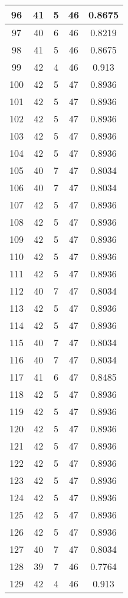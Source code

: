 \documentclass[letterpaper, 12pt]{article}
\begin{document}
\begin{longtable}{|c|c|c|c|c|}
\hline
96 & 41 & 5 & 46 & 0.8675 \\
\hline
97 & 40 & 6 & 46 & 0.8219 \\
\hline
98 & 41 & 5 & 46 & 0.8675 \\
\hline
99 & 42 & 4 & 46 & 0.913 \\
\hline
100 & 42 & 5 & 47 & 0.8936 \\
\hline
101 & 42 & 5 & 47 & 0.8936 \\
\hline
102 & 42 & 5 & 47 & 0.8936 \\
\hline
103 & 42 & 5 & 47 & 0.8936 \\
\hline
104 & 42 & 5 & 47 & 0.8936 \\
\hline
105 & 40 & 7 & 47 & 0.8034 \\
\hline
106 & 40 & 7 & 47 & 0.8034 \\
\hline
107 & 42 & 5 & 47 & 0.8936 \\
\hline
108 & 42 & 5 & 47 & 0.8936 \\
\hline
109 & 42 & 5 & 47 & 0.8936 \\
\hline
110 & 42 & 5 & 47 & 0.8936 \\
\hline
111 & 42 & 5 & 47 & 0.8936 \\
\hline
112 & 40 & 7 & 47 & 0.8034 \\
\hline
113 & 42 & 5 & 47 & 0.8936 \\
\hline
114 & 42 & 5 & 47 & 0.8936 \\
\hline
115 & 40 & 7 & 47 & 0.8034 \\
\hline
116 & 40 & 7 & 47 & 0.8034 \\
\hline
117 & 41 & 6 & 47 & 0.8485 \\
\hline
118 & 42 & 5 & 47 & 0.8936 \\
\hline
119 & 42 & 5 & 47 & 0.8936 \\
\hline
120 & 42 & 5 & 47 & 0.8936 \\
\hline
121 & 42 & 5 & 47 & 0.8936 \\
\hline
122 & 42 & 5 & 47 & 0.8936 \\
\hline
123 & 42 & 5 & 47 & 0.8936 \\
\hline
124 & 42 & 5 & 47 & 0.8936 \\
\hline
125 & 42 & 5 & 47 & 0.8936 \\
\hline
126 & 42 & 5 & 47 & 0.8936 \\
\hline
127 & 40 & 7 & 47 & 0.8034 \\
\hline
128 & 39 & 7 & 46 & 0.7764 \\
\hline
129 & 42 & 4 & 46 & 0.913 \\

\end{longtable}
\end{document}
